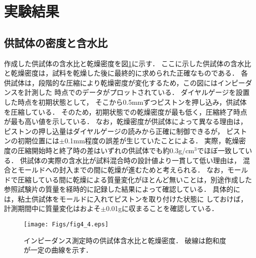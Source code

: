 \section{実験結果}
\subsection{供試体の密度と含水比}
作成した供試体の含水比と乾燥密度を図\ref{fig:fig4_4}に示す．
ここに示した供試体の含水比と乾燥密度は，試料を乾燥した後に最終的に求められた正確なものである．
各供試体は，段階的な圧縮により乾燥密度が変化するため，この図にはインピーダンスを計測した
時点でのデータがプロットされている．
ダイヤルゲージを設置した時点を初期状態として，
そこから0.5mmずつピストンを押し込み，供試体を圧縮している．
そのため，初期状態での乾燥密度が最も低く，圧縮終了時点が最も高い値を示している．
なお，乾燥密度が供試体によって異なる理由は，
ピストンの押し込量はダイヤルゲージの読みから正確に制御できるが，
ピストンの初期位置には$\pm$0.1mm程度の誤差が生じていたことによる．
実際，乾燥密度の圧縮開始時と終了時の差はいずれの供試体でも約0.3g/cm$^3$でほぼ一致している．
供試体の実際の含水比が試料混合時の設計値より一貫して低い理由は，
混合とモールドへの封入までの間に乾燥が進むためと考えられる．
なお，モールドで圧縮している間に乾燥による質量変化がほとんど無いことは，別途作成した
参照試験片の質量を経時的に記録した結果によって確認している．
具体的には，粘土供試体をモールドに入れてピストンを取り付けた状態に
しておけば，計測期間中に質量変化はおよそ$\pm$0.01gに収まることを確認している．
\begin{figure}[h]
	\begin{center}
	\texttt{[image: Figs/fig4\_4.eps]} 
	\end{center}
	\caption{
		インピーダンス測定時の供試体含水比と乾燥密度．
		破線は飽和度が一定の曲線を示す．
		} 
	\label{fig:fig4_4}
\end{figure}
